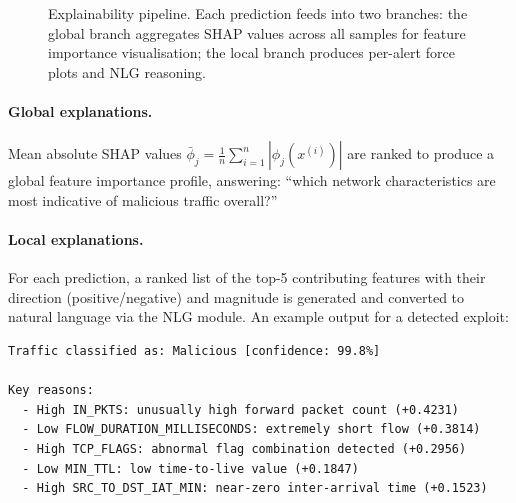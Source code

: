 \documentclass[12pt,a4paper]{article}
\begin{document}
\begin{figure}[h!]
{}
\caption{Explainability pipeline. Each prediction feeds into two branches:
the global branch aggregates SHAP values across all samples for feature importance
visualisation; the local branch produces per-alert force plots and NLG reasoning.}
\label{fig:arch_explainability}
\end{figure}

\paragraph{Global explanations.}
Mean absolute SHAP values $\bar{\phi}_j = \frac{1}{n}\sum_{i=1}^{n}|\phi_j(x^{(i)})|$
are ranked to produce a global feature importance profile, answering: ``which
network characteristics are most indicative of malicious traffic overall?''

\paragraph{Local explanations.}
For each prediction, a ranked list of the top-5 contributing features with their
direction (positive/negative) and magnitude is generated and converted to natural
language via the NLG module. An example output for a detected exploit:

\begin{lstlisting}[language={},caption={Example per-prediction NLG explanation}]
Traffic classified as: Malicious [confidence: 99.8%]

Key reasons:
  - High IN_PKTS: unusually high forward packet count (+0.4231)
  - Low FLOW_DURATION_MILLISECONDS: extremely short flow (+0.3814)
  - High TCP_FLAGS: abnormal flag combination detected (+0.2956)
  - Low MIN_TTL: low time-to-live value (+0.1847)
  - High SRC_TO_DST_IAT_MIN: near-zero inter-arrival time (+0.1523)
\end{lstlisting}
\end{document}
